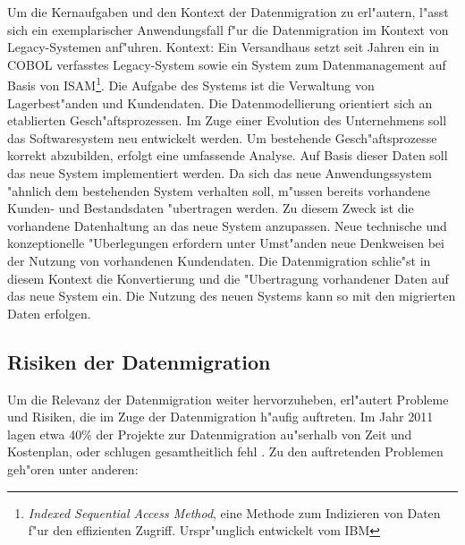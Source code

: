 Um die Kernaufgaben und den Kontext der Datenmigration zu erl"autern, l"asst sich ein exemplarischer Anwendungsfall f"ur die Datenmigration im Kontext von Legacy-Systemen anf"uhren.
\lb
Kontext:
Ein Versandhaus setzt seit Jahren ein in COBOL verfasstes Legacy-System sowie ein System zum Datenmanagement auf Basis von ISAM\footnote{\textit{Indexed Sequential Access Method}, eine Methode zum Indizieren von Daten f"ur den effizienten Zugriff. Urspr"unglich entwickelt vom IBM}. Die Aufgabe des Systems ist die Verwaltung von Lagerbest"anden und Kundendaten. Die Datenmodellierung orientiert sich an etablierten Gesch"aftsprozessen. 
\lb
Im Zuge einer Evolution des Unternehmens soll das Softwaresystem neu entwickelt werden. Um bestehende Gesch"aftsprozesse korrekt abzubilden, erfolgt eine umfassende Analyse. Auf Basis dieser Daten soll das neue System implementiert werden. Da sich das neue Anwendungssystem "ahnlich dem bestehenden System verhalten soll, m"ussen bereits vorhandene Kunden- und Bestandsdaten "ubertragen werden. Zu diesem Zweck ist die vorhandene Datenhaltung an das neue System anzupassen. Neue technische und konzeptionelle "Uberlegungen erfordern unter Umst"anden neue Denkweisen bei der Nutzung von vorhandenen Kundendaten. Die Datenmigration schlie"st in diesem Kontext die Konvertierung und die "Ubertragung vorhandener Daten auf das neue System ein. Die Nutzung des neuen Systems kann so mit den migrierten Daten erfolgen.

\newpage

\subsection{Risiken der Datenmigration}

Um die Relevanz der Datenmigration weiter hervorzuheben, erl"autert \citep{morris-2012} Probleme und Risiken, die im Zuge der Datenmigration h"aufig auftreten. Im Jahr 2011 lagen etwa 40\% der Projekte zur Datenmigration au"serhalb von Zeit und Kostenplan, oder schlugen gesamtheitlich fehl \citep{howard-2011}. Zu den auftretenden Problemen geh"oren unter anderen:


